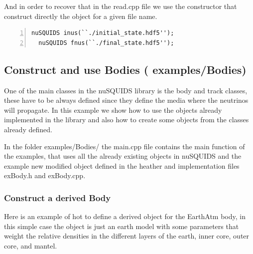 And in order to recover that in the {\ttf read.cpp} file we use the
constructor that construct directly the object for a given file name.

\begin{lstlisting}[frame=leftline, numbers =
  left,breaklines=true,label = ex:sin1]
  nuSQUIDS inus(``./initial_state.hdf5'');
  nuSQUIDS fnus(``./final_state.hdf5''); 
\end{lstlisting}


\subsection{Construct and use Bodies \textnormal{({\ttf
      examples/Bodies})}}
One of the main classes in the nuSQUIDS library is the body and track
classes, these have to be always defined since they define the media
where the neutrinos will propagate. 
In this example we show how to use the objects already implemented in
the library and also how to create some objects from the classes
already defined.

In the folder {\ttf examples/Bodies/} the {\ttf main.cpp} file
contains the main function of the examples, that uses all the already
existing objects in nuSQUIDS and the example new modified object
defined in the heather and implementation files {\ttf exBody.h} and
{\ttf exBody.cpp}.

\subsubsection{Construct a derived Body}

Here is an example of hot to define a derived object for the EarthAtm
body, in this simple case the object is just an earth model with some
parameters that weight the relative densities in the different layers
of the earth, inner core, outer core, and mantel.

